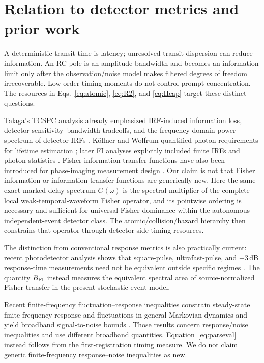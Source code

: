\documentclass[aps,prapplied,preprint,nofootinbib]{revtex4-2}
\begin{document}
\section{Relation to detector metrics and prior work}

A deterministic transit time is latency; unresolved transit dispersion can reduce information. An RC pole is an amplitude bandwidth and becomes an information limit only after the observation/noise model makes filtered degrees of freedom irrecoverable. Low-order timing moments do not control prompt concentration. The resources in Eqs.~\eqref{eq:atomic}, \eqref{eq:R2}, and \eqref{eq:Hcap} target these distinct questions.

Talaga's TCSPC analysis already emphasized IRF-induced information loss, detector sensitivity--bandwidth tradeoffs, and the frequency-domain power spectrum of detector IRFs \cite{Talaga2009}. K\"ollner and Wolfrum quantified photon requirements for lifetime estimation \cite{KollnerWolfrum1992}; later FI analyses explicitly included finite IRFs and photon statistics \cite{Bouchet2019,TrinhEsposito2021}. Fisher-information transfer functions have also been introduced for phase-imaging measurement design \cite{KoppellKasevich2021}. Our claim is not that Fisher information or information-transfer functions are generically new. Here the same exact marked-delay spectrum $G(\omega)$ is the spectral multiplier of the complete local weak-temporal-waveform Fisher operator, and its pointwise ordering is necessary and sufficient for universal Fisher dominance within the autonomous independent-event detector class. The atomic/collision/hazard hierarchy then constrains that operator through detector-side timing resources.

The distinction from conventional response metrics is also practically current: recent photodetector analysis shows that square-pulse, ultrafast-pulse, and $-3\,$dB response-time measurements need not be equivalent outside specific regimes \cite{Deng2026}. The quantity $B_{\rm FI}$ instead measures the equivalent spectral area of source-normalized Fisher transfer in the present stochastic event model.

Recent finite-frequency fluctuation--response inequalities constrain steady-state finite-frequency response and fluctuations in general Markovian dynamics and yield broadband signal-to-noise bounds \cite{Dechant2026}. Those results concern response/noise inequalities and use different broadband quantities. Equation~\eqref{eq:parseval} instead follows from the first-registration timing measure. We do not claim generic finite-frequency response--noise inequalities as new.
\end{document}
